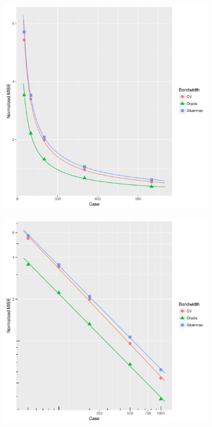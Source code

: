 \begin{figure}[htbp]
\begin{subfigure}[b]{0.24\textwidth}
    \label{fig:ise:unif_NCases_1h:rmise}
    \end{subfigure}
    \begin{subfigure}[b]{0.24\textwidth}
    \includegraphics[width=\textwidth]{results/by_num_cases/NMISE-vs-cases}
    \label{fig:ise:unif_NCases_1h:nmise}
    \end{subfigure}
    \begin{subfigure}[b]{0.24\textwidth}
    \includegraphics[width=\textwidth]{results/by_num_cases/NMISE-vs-cases-log-log}

\end{subfigure}
\end{figure}
